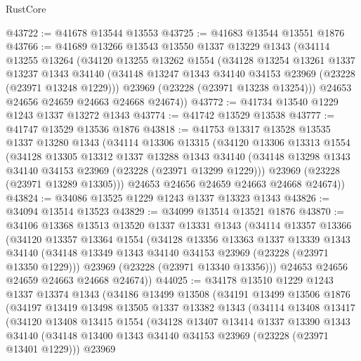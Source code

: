 \begin{lexlean}{RustCore}
\begin{coremodule}
@43722 := @41678 @13544 @13553
@43725 := @41683 @13544 @13551 @1876
@43766 := @41689
    @13266
    @13543
    @13550
    @1337
    @13229
    @1343
    (@34114
      @13255
      @13264
      (@34120
        @13255
        @13262
        @1554
        (@34128
          @13254
          @13261
          @1337
          @13237
          @1343
          @34140
          (@34148 @13247 @1343 @34140 @34153 @23969 (@23228 (@23971 @13248 @1229)))
          @23969
          (@23228 (@23971 @13238 @13254)))
        @24653
        @24656
        @24659
        @24663
        @24668
        @24674))
@43772 := @41734 @13540 @1229 @1243 @1337 @13272 @1343
@43774 := @41742 @13529 @13538
@43777 := @41747 @13529 @13536 @1876
@43818 := @41753
    @13317
    @13528
    @13535
    @1337
    @13280
    @1343
    (@34114
      @13306
      @13315
      (@34120
        @13306
        @13313
        @1554
        (@34128
          @13305
          @13312
          @1337
          @13288
          @1343
          @34140
          (@34148 @13298 @1343 @34140 @34153 @23969 (@23228 (@23971 @13299 @1229)))
          @23969
          (@23228 (@23971 @13289 @13305)))
        @24653
        @24656
        @24659
        @24663
        @24668
        @24674))
@43824 := @34086 @13525 @1229 @1243 @1337 @13323 @1343
@43826 := @34094 @13514 @13523
@43829 := @34099 @13514 @13521 @1876
@43870 := @34106
    @13368
    @13513
    @13520
    @1337
    @13331
    @1343
    (@34114
      @13357
      @13366
      (@34120
        @13357
        @13364
        @1554
        (@34128
          @13356
          @13363
          @1337
          @13339
          @1343
          @34140
          (@34148 @13349 @1343 @34140 @34153 @23969 (@23228 (@23971 @13350 @1229)))
          @23969
          (@23228 (@23971 @13340 @13356)))
        @24653
        @24656
        @24659
        @24663
        @24668
        @24674))
@44025 := @34178
    @13510
    @1229
    @1243
    @1337
    @13374
    @1343
    (@34186
      @13499
      @13508
      (@34191
        @13499
        @13506
        @1876
        (@34197
          @13419
          @13498
          @13505
          @1337
          @13382
          @1343
          (@34114
            @13408
            @13417
            (@34120
              @13408
              @13415
              @1554
              (@34128
                @13407
                @13414
                @1337
                @13390
                @1343
                @34140
                (@34148 @13400 @1343 @34140 @34153 @23969 (@23228 (@23971 @13401 @1229)))
                @23969

\end{coremodule}
\end{lexlean}
